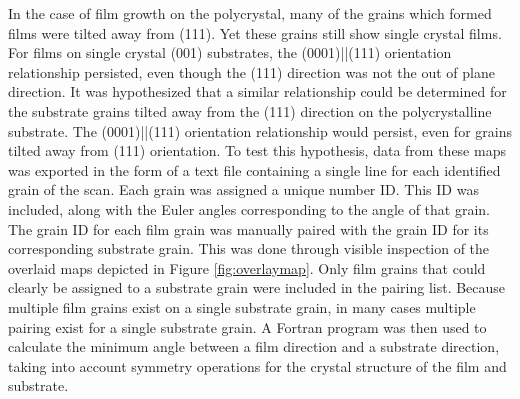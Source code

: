 In the case of film growth on the polycrystal, many of the grains which formed films were tilted away from (111). Yet these grains still show single crystal films. For  films on single crystal  (001) substrates, the (0001)||(111) orientation relationship persisted, even though the  (111) direction was not the out of plane direction. It was hypothesized that a similar relationship could be determined for the substrate grains tilted away from the (111) direction on the polycrystalline substrate. The (0001)||(111) orientation relationship would persist, even for grains tilted away from (111) orientation. To test this hypothesis, data from these maps was exported in the form of a text file containing a single line for each identified grain of the scan. Each grain was assigned a unique number ID. This ID was included, along with the Euler angles corresponding to the angle of that grain.  The grain ID for each film grain was manually paired with the grain ID for its corresponding substrate grain. This was done through visible inspection of the overlaid maps depicted in Figure \ref{fig:overlaymap}. Only film grains that could clearly be assigned to a substrate grain were included in the pairing list. Because multiple film grains exist on a single substrate grain, in many cases multiple pairing exist for a single substrate grain. A Fortran program  was then used to calculate the minimum angle between a film direction and a substrate direction, taking into account symmetry operations for the crystal structure of the film and substrate. 

